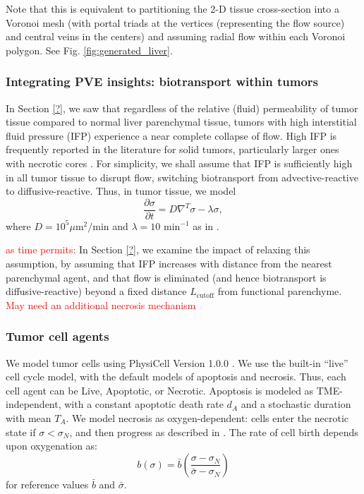 \documentclass[smallextended,natbib,draft]{svjour3}
\newcommand{\beq}{\begin{equation}}
\newcommand{\eeq}{\end{equation}}
\newcommand{\micron}{\mu\textrm{m}}
\newcommand{\red}[1]{\textcolor{red}{#1}}
\begin{document}
Note that this is equivalent to partitioning the 2-D tissue cross-section 
into a Voronoi mesh (with portal triads at the vertices (representing the 
flow source) and central veins in the centers) and assuming radial flow 
within each Voronoi polygon. See Fig. \ref{fig:generated_liver}. 

\subsubsection{Integrating PVE insights: biotransport within tumors}
In Section \ref{?}, we saw that regardless of the relative (fluid) permeability 
of tumor tissue compared to normal liver parenchymal tissue, tumors with 
high interstitial fluid pressure (IFP) experience a near complete collapse of 
flow. High IFP is frequently reported in the literature for solid tumors, particularly larger ones with necrotic cores  
\citep{?}. 
For simplicity, we shall assume that IFP is sufficiently high in all tumor tissue to 
disrupt flow, switching biotransport from advective-reactive to diffusive-reactive.  
Thus, in tumor tissue, we model 
\beq
\frac{\partial \sigma}{\partial t}  =  
D \nabla^T \sigma - \lambda \sigma, 
\eeq
where $D = 10^5 \micron^2/\textrm{min}$ and $\lambda = 10 \textrm{ min}^{-1}$ as 
in \citet{biofvm}.  

\red{as time permits: } 
In Section \ref{?}, we examine the impact of relaxing this 
assumption, by assuming that IFP increases with distance from the nearest parenchymal agent, and that flow is eliminated (and hence biotransport is 
diffusive-reactive) beyond a fixed distance $L_\mathrm{cutoff}$ from 
functional parenchyme. 
\red{May need an additional necrosis mechanism}

\subsubsection{Tumor cell agents}
\label{sec:tumor_agent_model}
We model tumor cells using PhysiCell Version 1.0.0 \citep{physicell}. We use the built-in ``live'' cell cycle model, 
with the default models of apoptosis and necrosis. Thus, each cell agent can be Live, Apoptotic, or Necrotic. 
Apoptosis is modeled as TME-independent, with a constant apoptotic death rate $d_A$ and a stochastic 
duration with mean $T_A$. We model necrosis as oxygen-dependent: cells enter the necrotic state if 
$\sigma < \sigma_N$, and then progress as described in \citet{physicell}. The rate of cell birth depends upon 
oxygenation as: 
\beq
b(\sigma)= \bar{b} \left( \frac{ \sigma -\sigma_N }{ \bar{\sigma} - \sigma_N } \right) 
\eeq
for reference values $\bar{b}$ and $\bar{\sigma}$. 
\end{document}
